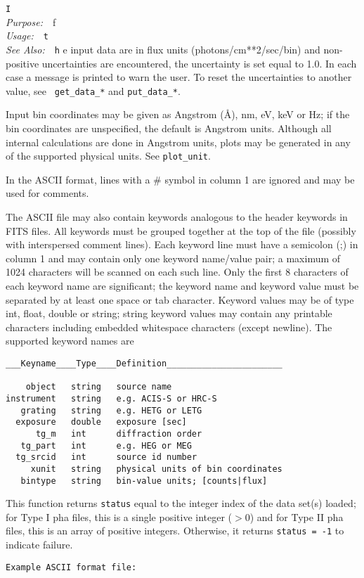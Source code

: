 \documentclass{book}
\makeatletter
\newif\ifpdf
\newenvironment{isisfunction}[4]%
{\index{{#1}@{\tt #1}}%
  \ifpdf
  \else
     \addcontentsline{toc}{subsection}{{#1} -- {#2}}
  \fi
  \vbox{
          \vspace*{\baselineskip}
          {\LARGE\tt #1}\vspace*{\baselineskip}\\
          {{\it Purpose:}~~{#2}}\\
          {{\it Usage:}~~{\tt #3}}\\
          {{\it See Also:}~~{\tt #4}}
       }
}%
{ }
\makeatother
\begin{document}
{\begin{isisfunction}
If the input data are in flux units (photons/cm**2/sec/bin) and
non-positive uncertainties are encountered, the uncertainty is
set equal to 1.0. In each case a message is printed to warn the
user.  To reset the uncertainties to another value, see {\tt
get\_data\_*} and {\tt put\_data\_*}.

Input bin coordinates may be given as Angstrom (\AA), nm, eV, keV or
Hz; if the bin coordinates are unspecified, the default is Angstrom
units. Although all internal calculations are done in Angstrom units,
plots may be generated in any of the supported physical units. See
{\tt plot\_unit}.

In the ASCII format, lines with a \# symbol in column 1 are ignored
and may be used for comments.

The ASCII file may also contain keywords analogous to the header
keywords in FITS files.  All keywords must be grouped together at the
top of the file (possibly with interspersed comment lines).  Each
keyword line must have a semicolon (;) in column 1 and may contain
only one keyword name/value pair; a maximum of 1024 characters will be
scanned on each such line. Only the first 8 characters of each keyword
name are significant; the keyword name and keyword value must be
separated by at least one space or tab character. Keyword values may
be of type int, float, double or string; string keyword values may
contain any printable characters including embedded whitespace
characters (except newline). The supported keyword names are

\begin{verbatim}
___Keyname____Type____Definition_______________________

    object   string   source name
instrument   string   e.g. ACIS-S or HRC-S
   grating   string   e.g. HETG or LETG
  exposure   double   exposure [sec]
      tg_m   int      diffraction order
   tg_part   int      e.g. HEG or MEG
  tg_srcid   int      source id number
     xunit   string   physical units of bin coordinates
   bintype   string   bin-value units; [counts|flux]
\end{verbatim}

This function returns {\tt status} equal to the integer index of the
data set(s) loaded; for Type I pha files, this is a single positive
integer ($> 0$) and for Type II pha files, this is an array of
positive integers.  Otherwise, it returns {\tt status = -1} to
indicate failure.

\begin{verbatim}
Example ASCII format file:


\end{verbatim}
\end{isisfunction}}
\end{document}
